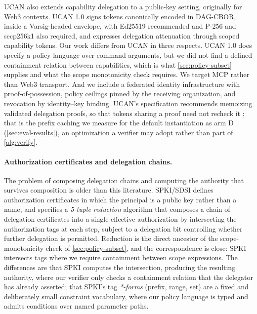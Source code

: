 \documentclass[11pt,a4paper]{article}
\begin{document}
UCAN \citep{ucan-spec} also extends capability delegation to a
public-key setting, originally for Web3 contexts. UCAN 1.0 signs
tokens canonically encoded in DAG-CBOR, inside a Varsig-headed envelope,
with Ed25519 recommended and P-256 and secp256k1 also required, and
expresses delegation attenuation through scoped capability tokens. Our work
differs from UCAN in three respects. UCAN 1.0 does specify a policy
language over command arguments, but we did not find a defined
containment relation between capabilities, which is what
\cref{sec:policy-subset} supplies and what the scope monotonicity check
requires. We target MCP rather than Web3 transport. And we include a
federated identity infrastructure with proof-of-possession, policy
ceilings pinned by the receiving organization, and revocation by
identity--key binding. UCAN's specification recommends memoizing
validated delegation proofs, so that tokens sharing a proof need not
recheck it \citep{ucan-spec}; that is the prefix caching we measure for
the default instantiation as arm D (\cref{sec:eval-results}), an
optimization a verifier may adopt rather than part of
\cref{alg:verify}.

\paragraph{Authorization certificates and delegation chains.}
The problem of composing delegation chains and computing the authority
that survives composition is older than this literature. SPKI/SDSI
\citep{rfc2693} defines authorization certificates in which the
principal is a public key rather than a name, and specifies a
\emph{5-tuple reduction} algorithm that composes a chain of delegation
certificates into a single effective authorization by intersecting the
authorization tags at each step, subject to a delegation bit controlling
whether further delegation is permitted. Reduction is the direct
ancestor of the scope-monotonicity check of \cref{sec:policy-subset},
and the correspondence is close: SPKI intersects tags where we require
containment between scope expressions. The differences are that SPKI
computes the intersection, producing the resulting authority, where our
verifier only checks a containment relation that the delegator has
already asserted; that SPKI's tag \emph{*-forms} (prefix, range, set)
are a fixed and deliberately small constraint vocabulary, where our
policy language is typed and admits conditions over named parameter
paths.
\end{document}
